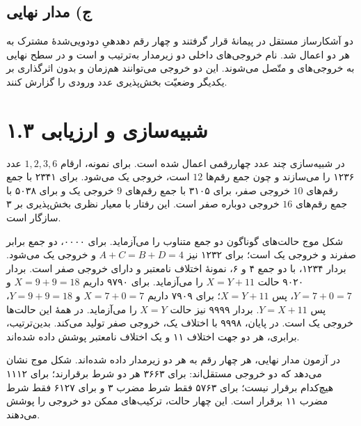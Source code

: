 \documentclass[12pt,a4paper]{article}
\begin{document}

	\subsection*{ج) مدار نهایی}
	دو آشکارساز مستقل در پیمانهٔ  قرار گرفتند و چهار رقم دهدهیِ دودویی‌شدهٔ مشترک به هر دو اعمال شد. نام خروجی‌های داخلی دو زیرمدار به‌ترتیب  و  است و در سطح نهایی به خروجی‌های  و  متّصل می‌شوند. این دو خروجی می‌توانند هم‌زمان و بدون اثرگذاری بر یکدیگر وضعیّت بخش‌پذیری عدد ورودی را گزارش کنند.


	\section*{۱.۳ شبیه‌سازی و ارزیابی}
	در شبیه‌سازی  چند عدد چهاررقمی اعمال شده است. برای نمونه، ارقام \(1,2,3,6\) عدد ۱۲۳۶ را می‌سازند و چون جمع رقم‌ها \(12\) است، خروجی  یک می‌شود. برای ۲۳۴۱ با جمع رقم‌های \(10\) خروجی صفر، برای ۳۱۰۵ با جمع رقم‌های \(9\) خروجی یک و برای ۵۰۳۸ با جمع رقم‌های \(16\) خروجی دوباره صفر است. این رفتار با معیار نظری بخش‌پذیری بر ۳ سازگار است.


	شکل موج  حالت‌های گوناگون دو جمع متناوب را می‌آزماید. برای ۰۰۰۰، دو جمع برابر صفرند و خروجی یک است؛ برای ۱۲۳۲ نیز \(A+C=B+D=4\) و خروجی یک می‌شود. بردار ۱۲۳۴، با دو جمع ۴ و ۶، نمونهٔ اختلاف نامعتبر و دارای خروجی صفر است. بردار ۹۰۲۰ حالت \(X=Y+11\) را می‌آزماید. برای ۹۷۹۰ داریم \(X=9+9=18\) و \(Y=7+0=7\)، پس \(X=Y+11\)؛ برای ۷۹۰۹ داریم \(X=7+0=7\) و \(Y=9+9=18\)، پس \(Y=X+11\). بردار ۹۹۹۹ نیز حالت \(X=Y\) را می‌آزماید. در همهٔ این حالت‌ها خروجی یک است. در پایان، ۹۹۹۸ با اختلاف یک، خروجی صفر تولید می‌کند. بدین‌ترتیب، برابری، هر دو جهت اختلاف ۱۱ و یک اختلاف نامعتبر پوشش داده شده‌اند.


	در آزمون مدار نهایی، هر چهار رقم به هر دو زیرمدار داده شده‌اند. شکل موج نشان می‌دهد که دو خروجی مستقل‌اند: برای ۳۶۶۳ هر دو شرط برقرارند؛ برای ۱۱۱۲ هیچ‌کدام برقرار نیست؛ برای ۵۷۶۳ فقط شرط مضرب ۳ و برای ۶۱۲۷ فقط شرط مضرب ۱۱ برقرار است. این چهار حالت، ترکیب‌های ممکن دو خروجی را پوشش می‌دهند.
\end{document}
